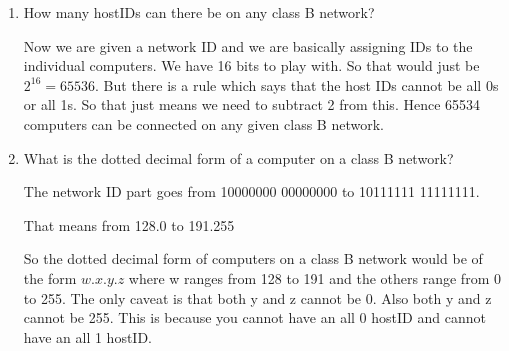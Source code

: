 \documentclass[12pt]{article}
\begin{document}
\begin{itemize}
\begin{enumerate}
\item How many hostIDs can there be on any class B network?

Now we are given a network ID and we are basically assigning IDs to the individual computers. We have 16 bits to play with. So that would just be $2^{16} = 65536$. But there is a rule which says that the host IDs cannot be all 0s or all 1s. So that just means we need to subtract 2 from this.
Hence 65534 computers can be connected on any given class B network.

\item What is the dotted decimal form of a computer on a class B network?

The network ID part goes from 10000000 00000000 to 10111111 11111111. 

That means from 128.0 to 191.255

So the dotted decimal form of computers on a class B network would be of the form $w.x.y.z$
where w ranges from 128 to 191 and the others range from 0 to 255.
The only caveat is that both y and z cannot be 0. Also both y and z cannot be 255.
This is because you cannot have an all 0 hostID and cannot have an all 1 hostID.

\end{enumerate}



\end{itemize}
\end{document}
